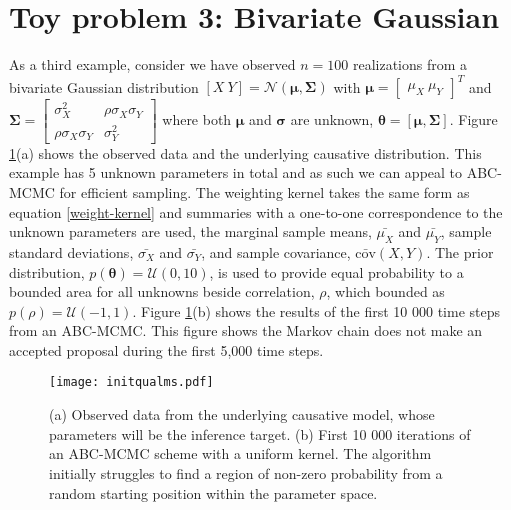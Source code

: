 \section{Toy problem 3: Bivariate Gaussian}
As a third example, consider we have observed $n = 100$ realizations from a bivariate Gaussian distribution $[X\ Y] = \mathcal{N}(\bm{\mu},\bm{\Sigma})$ with $\bm{\mu} = \begin{bmatrix}
\mu_X\ \mu_Y
\end{bmatrix}^T$ and $\bm{\Sigma} = \begin{bmatrix}
\sigma^2_X & \rho\sigma_X\sigma_Y\\
\rho\sigma_X\sigma_Y & \sigma^2_Y
\end{bmatrix} $ where both $\bm{\mu}$ and $\bm{\sigma}$ are unknown, $\bm{\theta} = [\bm{\mu},\bm{\Sigma}]$. Figure \ref{init-qualms}(a) shows the observed data and the underlying causative distribution. This example has 5 unknown parameters in total and as such we can appeal to ABC-MCMC for efficient sampling. The weighting kernel takes the same form as equation \ref{weight-kernel} and summaries with a one-to-one correspondence to the unknown parameters are used, the marginal sample means, $\bar{\mu_X}$ and $\bar{\mu_Y}$, sample standard deviations, $\bar{\sigma_X}$ and $\bar{\sigma_Y}$, and sample covariance, $\bar{\text{cov}}(X,Y)$. The prior distribution, $p(\bm{\theta}) = \mathcal{U}(0,10)$, is used to provide equal probability to a bounded area for all unknowns beside correlation, $\rho$, which bounded as $p(\rho) = \mathcal{U}(-1,1)$. Figure \ref{init-qualms}(b) shows the results of the first 10 000 time steps from an ABC-MCMC. This figure shows the Markov chain does not make an accepted proposal during the first 5,000 time steps.
\begin{figure}[H]
	\centering
	\texttt{[image: initqualms.pdf]}
	\caption{(a) Observed data from the underlying causative model, whose parameters will be the inference target. (b) First 10 000 iterations of an ABC-MCMC scheme with a uniform kernel. The algorithm initially struggles to find a region of non-zero probability from a random starting position within the parameter space.}
	\label{init-qualms}
\end{figure}

